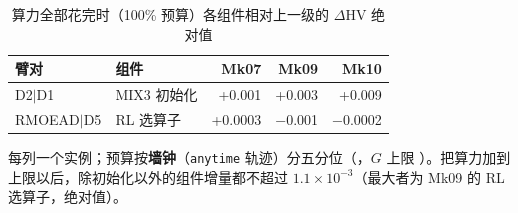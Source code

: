 \begin{table}[htbp]
  \centering
  \caption{算力全部花完时（100\% 预算）各组件相对上一级的 $\Delta$HV 绝对值}
  \label{tab:surface}
  \small
  \begin{tabular}{llrrr}
    \toprule
    臂对 & 组件 & Mk07 & Mk09 & Mk10 \\
    \midrule
    D2$|$D1 & MIX3 初始化 & +0.001 & +0.003 & +0.009 \\
    RMOEAD$|$D5 & RL 选算子 & +0.0003 & −0.001 & −0.0002 \\
    \bottomrule
  \end{tabular}
  \par\vspace{3pt}\footnotesize\begin{minipage}{\linewidth}每列一个实例；预算按\textbf{墙钟}（\texttt{anytime} 轨迹）分五分位（\SurfBudgets，$G$ 上限 \SetGMax）。把算力加到上限以后，除初始化以外的组件增量都不超过 $1.1\times10^{-3}$（最大者为 Mk09 的 RL 选算子，绝对值）。\end{minipage}
\end{table}
